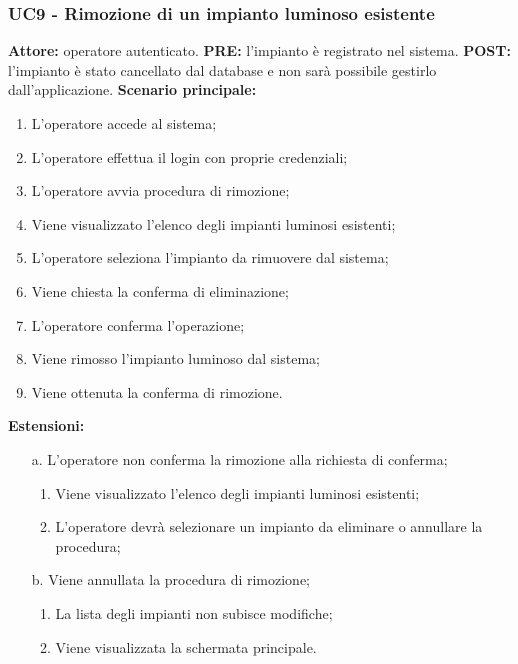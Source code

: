 \documentclass[a4paper, 12pt]{article}
\begin{document}
\subsubsection{UC9 - Rimozione di un impianto luminoso esistente}
\textbf{Attore:} operatore autenticato.\newline
\textbf{PRE:} l'impianto è registrato nel sistema.\newline
\textbf{POST:} l'impianto è stato cancellato dal database e non sarà possibile gestirlo dall'applicazione.\newline
\textbf{Scenario principale:}
\begin{enumerate}
    \item L'operatore accede al sistema;
    \item L'operatore effettua il login con proprie credenziali;
    \item L'operatore avvia procedura di rimozione;
    \item Viene visualizzato l'elenco degli impianti luminosi esistenti;
    \item L'operatore seleziona l'impianto da rimuovere dal sistema;
    \item Viene chiesta la conferma di eliminazione;
    \item L'operatore conferma l'operazione;
    \item Viene rimosso l'impianto luminoso dal sistema;
    \item Viene ottenuta la conferma di rimozione.
\end{enumerate}
\textbf{Estensioni:}
\begin{itemize}
    \item [a.] L'operatore non conferma la rimozione alla richiesta di conferma;
    \begin{enumerate}
        \item Viene visualizzato l'elenco degli impianti luminosi esistenti;
        \item L'operatore devrà selezionare un impianto da eliminare o annullare la procedura;
    \end{enumerate}
    \item [b.] Viene annullata la procedura di rimozione;
    \begin{enumerate}
        \item La lista degli impianti non subisce modifiche;
        \item Viene visualizzata la schermata principale.
    \end{enumerate}
\end{itemize}
\end{document}
